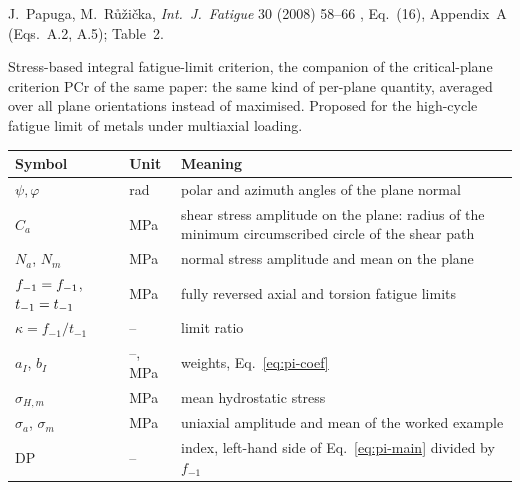 \label{sheet:PI}

 J.~Papuga, M.~R\r{u}\v{z}i\v{c}ka, \emph{Int.\ J.\ Fatigue} 30 (2008) 58--66
\cite{papuga2008}, Eq.~(16), Appendix~A (Eqs.~A.2, A.5); Table~2.

 Stress-based integral fatigue-limit criterion, the companion of the
critical-plane criterion PCr of the same paper: the same kind of per-plane quantity, averaged over
all plane orientations instead of maximised. Proposed for the high-cycle fatigue limit of metals
under multiaxial loading.

\begin{center}\small
\begin{tabular}{@{}llp{100mm}@{}}
\toprule
Symbol & Unit & Meaning\\\midrule
$\psi,\varphi$ & rad & polar and azimuth angles of the plane normal\\
$C_a$ & MPa & shear stress amplitude on the plane: radius of the minimum circumscribed circle of the shear path\\
$N_a$, $N_m$ & MPa & normal stress amplitude and mean on the plane\\
$f_{-1}=f_{-1}$, $t_{-1}=t_{-1}$ & MPa & fully reversed axial and torsion fatigue limits\\
$\kappa=f_{-1}/t_{-1}$ & -- & limit ratio\\
$a_I$, $b_I$ & --, MPa & weights, Eq.~\eqref{eq:pi-coef}\\
$\sigma_{H,m}$ & MPa & mean hydrostatic stress\\
$\sigma_a$, $\sigma_m$ & MPa & uniaxial amplitude and mean of the worked example\\
$\mathrm{DP}$ & -- & index, left-hand side of Eq.~\eqref{eq:pi-main} divided by $f_{-1}$\\
\bottomrule
\end{tabular}
\end{center}

